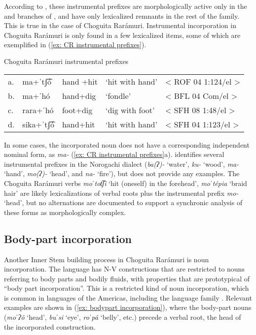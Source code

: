 \z

According to \citet{langacker1977uto}, these instrumental prefixes are morphologically active only in the  and  branches of , and have only lexicalized remnants in the rest of the  family. This is true in the case of Choguita Rarámuri. Instrumental incorporation in Choguita Rarámuri is only found in a few lexicalized items, some of which are exemplified in (\ref{ex: CR instrumental prefixes}).

\ea\label{ex: CR instrumental prefixes}
{Choguita Rarámuri instrumental prefixes}

\begin{tabular}{lllll}
     a. &  {ma+ˈtʃ͡ó}&{hand +hit}&{‘hit with hand’}&{< ROF 04 1:124/el >}\\
     b. & {ma+ˈhó}&{hand+dig}&{`fondle'}&{< BFL 04 Com/el >}\\
     c. & {rara+ˈhó}&{foot+dig}&{‘dig with foot’}&{< SFH 08 1:48/el >}\\
     d. & {sika+ˈtʃ͡ó}&{hand+hit}&{`hit with hand'}&{< SFH 04 1:123/el >}\\
\end{tabular}

\z

In some cases, the incorporated noun does not have a corresponding independent nominal form, as \textit{ma-} (\ref{ex: CR instrumental prefixes}a). \citep[87]{lionnet2001sufijos} identifies several instrumental prefixes in the Norogachi dialect (\textit{ba(ʔ)-} ‘water’, \textit{ku-} ‘wood’, \textit{ma-} ‘hand’, \textit{mo(ʔ)-} ‘head’, and \textit{na-} ‘fire’), but does not provide any examples. The Choguita Rarámuri verbs \textit{moˈtot͡ʃi} ‘hit (oneself) in the forehead’, \textit{moˈtépia} ‘braid hair' are likely lexicalizations of verbal roots plus the instrumental prefix \textit{mo-} ‘head’, but no alternations are documented to support a synchronic analysis of these forms as morphologically complex.


\subsection{Body-part incorporation}
\label{subsec: body-part incorporation}

Another Inner Stem building process in Choguita Rarámuri is noun incorporation. The language has N-V constructions that are restricted to nouns referring to body parts and bodily fluids, with properties that are prototypical of ``body part incorporation''. This is a restricted kind of noun incorporation, which is common in languages of the Americas, including the  language family \parencite{baker1988incorporation}. Relevant examples are shown in (\ref{ex: bodypart  incorporation}), where the body-part nouns (\textit{moˈʔô} ‘head’, \textit{buˈsi} ‘eye’, \textit{roˈpâ} ‘belly’, etc.) precede a verbal root, the head of the incorporated construction.

